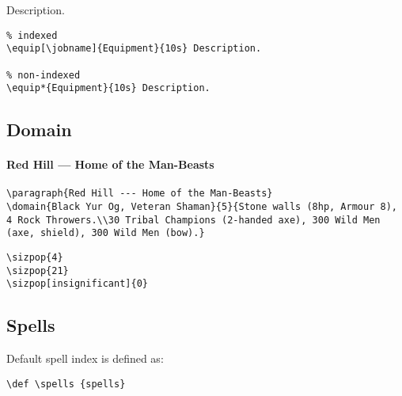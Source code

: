 \documentclass[itdr]{subfiles}
\begin{document}
 Description.
\begin{lstlisting}
% indexed
\equip[\jobname]{Equipment}{10s} Description.

% non-indexed
\equip*{Equipment}{10s} Description.
\end{lstlisting}

\vfill

\subsection{Domain}

\paragraph{Red Hill --- Home of the Man-Beasts}

\begin{lstlisting}
\paragraph{Red Hill --- Home of the Man-Beasts}
\domain{Black Yur Og, Veteran Shaman}{5}{Stone walls (8hp, Armour 8), 4 Rock Throwers.\\30 Tribal Champions (2-handed axe), 300 Wild Men (axe, shield), 300 Wild Men (bow).}
\end{lstlisting}




\begin{lstlisting}
\sizpop{4}
\sizpop{21}
\sizpop[insignificant]{0}
\end{lstlisting}

\break

\subsection{Spells}

Default spell index is defined as:
\begin{lstlisting}
\def \spells {spells}
\end{lstlisting}

%
\end{document}
